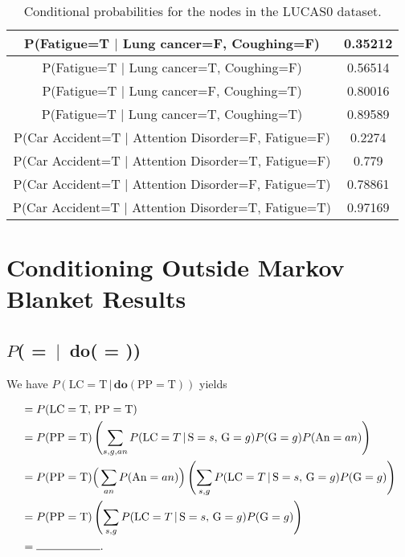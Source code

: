 \documentclass{article}
\begin{document}
\begin{table}[h]
\begin{tabular}{|c|c|}
        P(Fatigue=T $\vert$ Lung cancer=F, Coughing=F) & 0.35212 \\ \hline
        P(Fatigue=T $\vert$ Lung cancer=T, Coughing=F) & 0.56514 \\ \hline
        P(Fatigue=T $\vert$ Lung cancer=F, Coughing=T) & 0.80016 \\ \hline
        P(Fatigue=T $\vert$ Lung cancer=T, Coughing=T) & 0.89589 \\ \hline
        P(Car Accident=T $\vert$ Attention Disorder=F, Fatigue=F) & 0.2274 \\ \hline
        P(Car Accident=T $\vert$ Attention Disorder=T, Fatigue=F) & 0.779 \\ \hline
        P(Car Accident=T $\vert$ Attention Disorder=F, Fatigue=T) & 0.78861 \\ \hline
        P(Car Accident=T $\vert$ Attention Disorder=T, Fatigue=T) & 0.97169 \\ \hline
        \hline
    \end{tabular}
    \caption{Conditional probabilities for the nodes in the LUCAS0 dataset.}
    \label{tab:lucas_probs}
\end{table}


\section{Conditioning Outside Markov Blanket Results}
\label{do_work}

\subsection{$P$( =  \,$\vert$\, \textbf{do}( = ))}

We have $P(\text{LC} = \text{T} \,\vert\, \textbf{do}(\text{PP} = \text{T}))$ yields

\begin{align*}
     &= P(\text{LC} = \text{T},\, \text{PP} = \text{T}) \\
        &= P(\text{PP} = \text{T})\left(\sum_{s, g, an}P(\text{LC} = T \,|\, \text{S} = s,\, \text{G} = g)P(\text{G} = g)P(\text{An} = an)\right) \\
        &= P(\text{PP} = \text{T})\Big(\sum_{an}P(\text{An} = an)\Big)\left(\sum_{s, g}P(\text{LC} = T \,|\, \text{S} = s,\, \text{G} = g)P(\text{G} = g)\right) \\
        &= P(\text{PP} = \text{T})\left(\sum_{s, g}P(\text{LC} = T \,|\, \text{S} = s,\, \text{G} = g)P(\text{G} = g)\right) \\
    &= \rule{2cm}{0.15mm}.
\end{align*}
\end{document}
